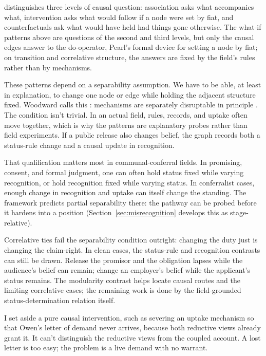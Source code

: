 \documentclass[12pt]{article}
\begin{document}
\textcite{pearl2009} distinguishes three levels of causal question: association asks what accompanies what, intervention asks what would follow if a node were set by fiat, and counterfactuals ask what would have held had things gone otherwise. The what-if patterns above are questions of the second and third levels, but only the causal edges answer to the do-operator, Pearl's formal device for setting a node by fiat; on transition and correlative structure, the answers are fixed by the field's rules rather than by mechanisms.

These patterns depend on a separability assumption. We have to be able, at least in explanation, to change one node or edge while holding the adjacent structure fixed. Woodward calls this : mechanisms are separately disruptable in principle \citep{woodward2003MakingThingsHappen}. The condition isn't trivial. In an actual field, rules, records, and uptake often move together, which is why the patterns are explanatory probes rather than field experiments. If a public release also changes belief, the graph records both a status-rule change and a causal update in recognition.

That qualification matters most in communal-conferral fields. In promising, consent, and formal judgment, one can often hold status fixed while varying recognition, or hold recognition fixed while varying status. In conferralist cases, enough change in recognition and uptake can itself change the standing. The framework predicts partial separability there: the pathway can be probed before it hardens into a position (Section~\ref{sec:misrecognition} develops this as stage-relative).

Correlative ties fail the separability condition outright: changing the duty just is changing the claim-right. In clean cases, the status-rule and recognition contrasts can still be drawn. Release the promisor and the obligation lapses while the audience's belief can remain; change an employer's belief while the applicant's status remains. The modularity contrast helps locate causal routes and the limiting correlative cases; the remaining work is done by the field-grounded status-determination relation itself.

I set aside a pure causal intervention, such as severing an uptake mechanism so that Owen's letter of demand never arrives, because both reductive views already grant it. It can't distinguish the reductive views from the coupled account. A lost letter is too easy; the problem is a live demand with no warrant.
\end{document}
